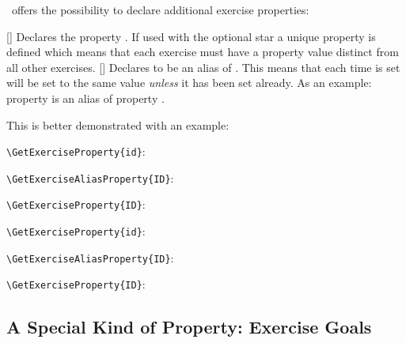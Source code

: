 \documentclass[load-preamble+]{cnltx-doc}
\begin{document}
\xsim\ offers the possibility to declare additional exercise properties:
\begin{commands}
  [\sarg{}]
    Declares the property .  If used with the optional star a
    unique property is defined which means that each exercise must have a
    property value distinct from all other exercises.
  []
    Declares  to be an alias of .  This
    means that each time  is set  will be
    set to the same value \emph{unless} it has been set already.  As an
    example: property  is an alias of property .
\end{commands}

This is better demonstrated with an example:
\begin{example}[outside]
  \begin{exercise}
    \lipsum[4] %
    \verb+\GetExerciseProperty{id}+:  \par
    \verb+\GetExerciseAliasProperty{ID}+:  \par
    \verb+\GetExerciseProperty{ID}+: 
  \end{exercise}
  \begin{exercise}[ID=foo-bar]
    \lipsum[4]
    \verb+\GetExerciseProperty{id}+:  \par
    \verb+\GetExerciseAliasProperty{ID}+:  \par
    \verb+\GetExerciseProperty{ID}+: 
  \end{exercise}
\end{example}

\subsection{A Special Kind of Property: Exercise Goals}
\end{document}
